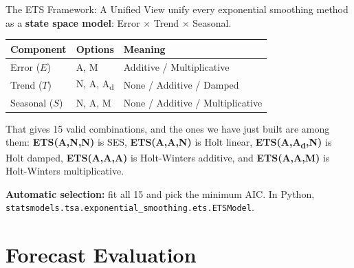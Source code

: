 \documentclass[aspectratio=169, 11pt]{beamer}
\begin{document}
\begin{frame}{The ETS Framework: A Unified View}
  \textcite{Hyndman2021} unify every exponential smoothing method as a
  \textbf{state space model}: Error $\times$ Trend $\times$ Seasonal.
  \begin{center}
    {\small
    \begin{tabular}{lll}
      \toprule
      \textbf{Component} & \textbf{Options} & \textbf{Meaning} \\
      \midrule
      Error ($E$)    & A, M & Additive / Multiplicative \\
      Trend ($T$)    & N, A, A\textsubscript{d} & None / Additive / Damped \\
      Seasonal ($S$) & N, A, M & None / Additive / Multiplicative \\
      \bottomrule
    \end{tabular}
    }
  \end{center}
  That gives 15 valid combinations, and the ones we have just built are among
  them: \textbf{ETS(A,N,N)} is SES, \textbf{ETS(A,A,N)} is Holt linear,
  \textbf{ETS(A,A\textsubscript{d},N)} is Holt damped, \textbf{ETS(A,A,A)} is
  Holt-Winters additive, and \textbf{ETS(A,A,M)} is Holt-Winters multiplicative.

  \vspace{0.15cm}
  \textbf{Automatic selection:} fit all 15 and pick the minimum AIC. In Python,
  \texttt{statsmodels.tsa.exponential\_smoothing.ets.ETSModel}.
\end{frame}

\section{Forecast Evaluation}

\end{document}
